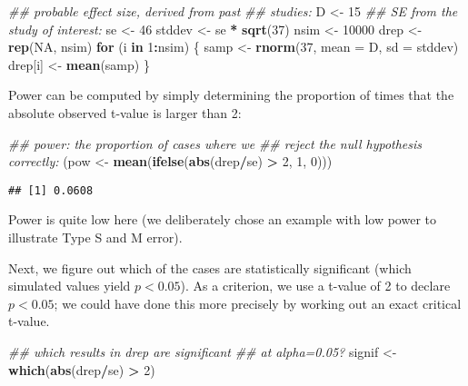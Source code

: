 \documentclass[12pt,]{krantz}
\newenvironment{Shaded}{\begin{snugshade}}{\end{snugshade}}
\newcommand{\CommentTok}[1]{\textcolor[rgb]{0.56,0.35,0.01}{\textit{#1}}}
\newcommand{\ControlFlowTok}[1]{\textcolor[rgb]{0.13,0.29,0.53}{\textbf{#1}}}
\newcommand{\DataTypeTok}[1]{\textcolor[rgb]{0.13,0.29,0.53}{#1}}
\newcommand{\DecValTok}[1]{\textcolor[rgb]{0.00,0.00,0.81}{#1}}
\newcommand{\KeywordTok}[1]{\textcolor[rgb]{0.13,0.29,0.53}{\textbf{#1}}}
\newcommand{\NormalTok}[1]{#1}
\newcommand{\OperatorTok}[1]{\textcolor[rgb]{0.81,0.36,0.00}{\textbf{#1}}}
\newcommand{\OtherTok}[1]{\textcolor[rgb]{0.56,0.35,0.01}{#1}}
\newcommand{\StringTok}[1]{\textcolor[rgb]{0.31,0.60,0.02}{#1}}
\begin{document}
\begin{Shaded}
\begin{Highlighting}[]
\CommentTok{## probable effect size, derived from past}
\CommentTok{## studies:}
\NormalTok{D <-}\StringTok{ }\DecValTok{15}
\CommentTok{## SE from the study of interest:}
\NormalTok{se <-}\StringTok{ }\DecValTok{46}
\NormalTok{stddev <-}\StringTok{ }\NormalTok{se }\OperatorTok{*}\StringTok{ }\KeywordTok{sqrt}\NormalTok{(}\DecValTok{37}\NormalTok{)}
\NormalTok{nsim <-}\StringTok{ }\DecValTok{10000}
\NormalTok{drep <-}\StringTok{ }\KeywordTok{rep}\NormalTok{(}\OtherTok{NA}\NormalTok{, nsim)}
\ControlFlowTok{for}\NormalTok{ (i }\ControlFlowTok{in} \DecValTok{1}\OperatorTok{:}\NormalTok{nsim) \{}
\NormalTok{  samp <-}\StringTok{ }\KeywordTok{rnorm}\NormalTok{(}\DecValTok{37}\NormalTok{, }\DataTypeTok{mean =}\NormalTok{ D, }\DataTypeTok{sd =}\NormalTok{ stddev)}
\NormalTok{  drep[i] <-}\StringTok{ }\KeywordTok{mean}\NormalTok{(samp)}
\NormalTok{\}}
\end{Highlighting}
\end{Shaded}

Power can be computed by simply determining the proportion of times that the absolute observed t-value is larger than 2:

\begin{Shaded}
\begin{Highlighting}[]
\CommentTok{## power: the proportion of cases where we}
\CommentTok{## reject the null hypothesis correctly:}
\NormalTok{(pow <-}\StringTok{ }\KeywordTok{mean}\NormalTok{(}\KeywordTok{ifelse}\NormalTok{(}\KeywordTok{abs}\NormalTok{(drep}\OperatorTok{/}\NormalTok{se) }\OperatorTok{>}\StringTok{ }\DecValTok{2}\NormalTok{, }\DecValTok{1}\NormalTok{, }
  \DecValTok{0}\NormalTok{)))}
\end{Highlighting}
\end{Shaded}

\begin{verbatim}
## [1] 0.0608
\end{verbatim}

Power is quite low here (we deliberately chose an example with low power to illustrate Type S and M error).

Next, we figure out which of the cases are statistically significant (which simulated values yield \(p<0.05\)). As a criterion, we use a t-value of 2 to declare \(p<0.05\); we could have done this more precisely by working out an exact critical t-value.

\begin{Shaded}
\begin{Highlighting}[]
\CommentTok{## which results in drep are significant}
\CommentTok{## at alpha=0.05?}
\NormalTok{signif <-}\StringTok{ }\KeywordTok{which}\NormalTok{(}\KeywordTok{abs}\NormalTok{(drep}\OperatorTok{/}\NormalTok{se) }\OperatorTok{>}\StringTok{ }\DecValTok{2}\NormalTok{)}
\end{Highlighting}
\end{Shaded}
\end{document}
